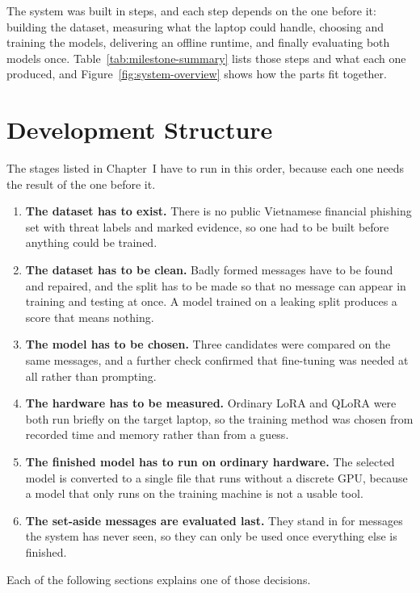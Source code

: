 The system was built in steps, and each step depends on the one before it: building the dataset, measuring what the laptop could handle, choosing and training the models, delivering an offline runtime, and finally evaluating both models once. Table~\ref{tab:milestone-summary} lists those steps and what each one produced, and Figure~\ref{fig:system-overview} shows how the parts fit together.




\section{Development Structure}
The stages listed in Chapter~I have to run in this order, because each one needs the result of the one before it.

\begin{enumerate}\itemsep2pt
\item \textbf{The dataset has to exist.} There is no public Vietnamese financial phishing set with threat labels and marked evidence, so one had to be built before anything could be trained.
\item \textbf{The dataset has to be clean.} Badly formed messages have to be found and repaired, and the split has to be made so that no message can appear in training and testing at once. A model trained on a leaking split produces a score that means nothing.
\item \textbf{The model has to be chosen.} Three candidates were compared on the same messages, and a further check confirmed that fine-tuning was needed at all rather than prompting.
\item \textbf{The hardware has to be measured.} Ordinary LoRA and QLoRA were both run briefly on the target laptop, so the training method was chosen from recorded time and memory rather than from a guess.
\item \textbf{The finished model has to run on ordinary hardware.} The selected model is converted to a single file that runs without a discrete GPU, because a model that only runs on the training machine is not a usable tool.
\item \textbf{The set-aside messages are evaluated last.} They stand in for messages the system has never seen, so they can only be used once everything else is finished.
\end{enumerate}

\noindent Each of the following sections explains one of those decisions.

